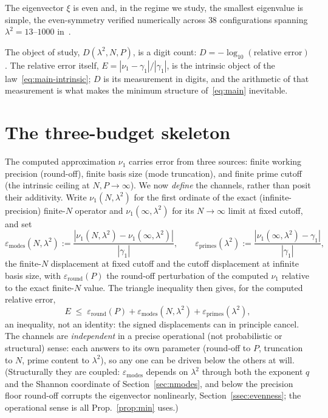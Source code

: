 \documentclass[11pt,a4paper]{article}
\begin{document}
The eigenvector $\xi$ is even and, in the regime we
study, the smallest eigenvalue is simple, the even-symmetry verified
numerically across $38$ configurations spanning $\lambda^2=13$--$1000$
in~\cite{AndrewsA}.

The object of study, $D(\lambda^2,N,P)$, is a digit count: $D=-\log_{10}
(\text{relative error})$. The relative error itself,
$E=|\nu_1-\gamma_1|/|\gamma_1|$, is the intrinsic object of the
law~\eqref{eq:main-intrinsic}; $D$ is its measurement in digits, and the
arithmetic of that measurement is what makes the minimum structure
of~\eqref{eq:main} inevitable.

\section{The three-budget skeleton}\label{sec:skeleton}

The computed approximation $\nu_1$ carries error from three sources:
finite working precision (round-off), finite basis size (mode truncation), and
finite prime cutoff (the intrinsic ceiling at $N,P\to\infty$). We now
\emph{define} the channels, rather than posit their additivity. Write
$\nu_1(N,\lambda^2)$ for the first ordinate of the exact (infinite-precision)
finite-$N$ operator and $\nu_1(\infty,\lambda^2)$ for its $N\to\infty$ limit at
fixed cutoff, and set
\begin{equation}\label{eq:channels}
  \varepsilon_{\mathrm{modes}}(N,\lambda^2)
   :=\frac{|\nu_1(N,\lambda^2)-\nu_1(\infty,\lambda^2)|}{|\gamma_1|},
  \qquad
  \varepsilon_{\mathrm{primes}}(\lambda^2)
   :=\frac{|\nu_1(\infty,\lambda^2)-\gamma_1|}{|\gamma_1|},
\end{equation}
the finite-$N$ displacement at fixed cutoff and the cutoff displacement at
infinite basis size, with $\varepsilon_{\mathrm{round}}(P)$ the round-off
perturbation of the computed $\nu_1$ relative to the exact finite-$N$ value.
The triangle inequality then gives, for the computed relative error,
\[
  E \;\le\; \varepsilon_{\mathrm{round}}(P)
  +\varepsilon_{\mathrm{modes}}(N,\lambda^2)+\varepsilon_{\mathrm{primes}}(\lambda^2),
\]
an inequality, not an identity: the signed displacements can in principle
cancel. The channels are \emph{independent} in a precise operational (not
probabilistic or structural) sense: each answers to its own parameter
(round-off to $P$, truncation to $N$, prime content to $\lambda^2$), so any
one can be driven below the others at will. (Structurally they are coupled:
$\varepsilon_{\mathrm{modes}}$ depends on $\lambda^2$ through both the exponent
$q$ and the Shannon coordinate of Section~\ref{sec:nmodes}, and below the
precision floor round-off corrupts the eigenvector nonlinearly,
Section~\ref{ssec:evenness}; the operational sense is all
Prop.~\ref{prop:min} uses.)
\end{document}
